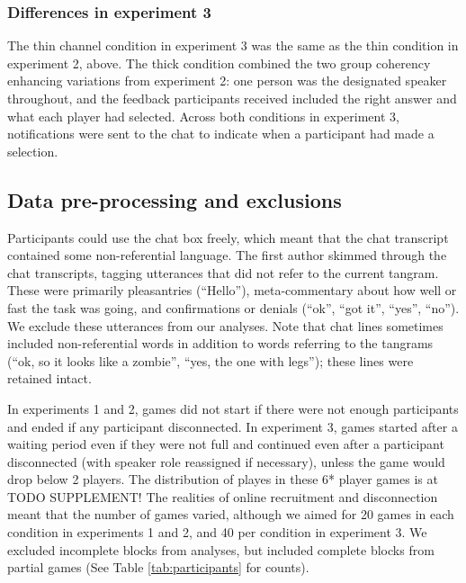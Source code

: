 \documentclass[
  english,
  a4paper,
]{article}
\begin{document}
\hypertarget{differences-in-experiment-3}{%
\subsubsection{Differences in experiment 3}\label{differences-in-experiment-3}}

The thin channel condition in experiment 3 was the same as the thin condition in experiment 2, above. The thick condition combined the two group coherency enhancing variations from experiment 2: one person was the designated speaker throughout, and the feedback participants received included the right answer and what each player had selected. Across both conditions in experiment 3, notifications were sent to the chat to indicate when a participant had made a selection.

\hypertarget{data-pre-processing-and-exclusions}{%
\subsection{Data pre-processing and exclusions}\label{data-pre-processing-and-exclusions}}

Participants could use the chat box freely, which meant that the chat transcript contained some non-referential language. The first author skimmed through the chat transcripts, tagging utterances that did not refer to the current tangram. These were primarily pleasantries (``Hello''), meta-commentary about how well or fast the task was going, and confirmations or denials (``ok'', ``got it'', ``yes'', ``no''). We exclude these utterances from our analyses. Note that chat lines sometimes included non-referential words in addition to words referring to the tangrams (``ok, so it looks like a zombie'', ``yes, the one with legs''); these lines were retained intact.

In experiments 1 and 2, games did not start if there were not enough participants and ended if any participant disconnected. In experiment 3, games started after a waiting period even if they were not full and continued even after a participant disconnected (with speaker role reassigned if necessary), unless the game would drop below 2 players. The distribution of playes in these 6* player games is at TODO SUPPLEMENT! The realities of online recruitment and disconnection meant that the number of games varied, although we aimed for 20 games in each condition in experiments 1 and 2, and 40 per condition in experiment 3. We excluded incomplete blocks from analyses, but included complete blocks from partial games (See Table \ref{tab:participants} for counts).
\end{document}
